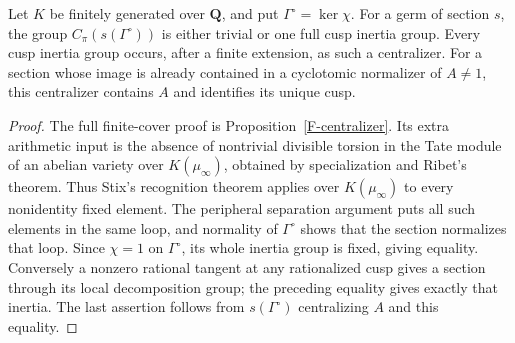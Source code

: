 \begin{proposition}
\label{A:cyclotomic-centralizer}
Let $K$ be finitely generated over $\mathbf Q$, and put
$\Gamma^\circ=\ker\chi$.  For a germ of section $s$, the
group $C_\pi(s(\Gamma^\circ))$ is either trivial or one
full cusp inertia group.  Every cusp inertia group
occurs, after a finite extension, as such a centralizer.
For a section whose image is already contained in a
cyclotomic normalizer of $A\ne1$, this centralizer contains
$A$ and identifies its unique cusp.
\end{proposition}
\begin{proof}
The full finite-cover proof is Proposition~\ref{F-centralizer}.
Its extra arithmetic input is the absence of nontrivial
divisible torsion in the Tate module of an abelian variety
over $K(\mu_\infty)$, obtained by specialization and Ribet's
theorem.  Thus Stix's recognition theorem applies over
$K(\mu_\infty)$ to every nonidentity fixed element.
The peripheral separation argument puts all such
elements in the same loop, and normality of
$\Gamma^\circ$ shows that the section normalizes that
loop.  Since $\chi=1$ on $\Gamma^\circ$, its whole
inertia group is fixed, giving equality.  Conversely a
nonzero rational tangent at any rationalized cusp
gives a section through its local decomposition group;
the preceding equality gives exactly that inertia.
The last assertion follows from
$s(\Gamma^\circ)$ centralizing $A$ and this equality.
\end{proof}

